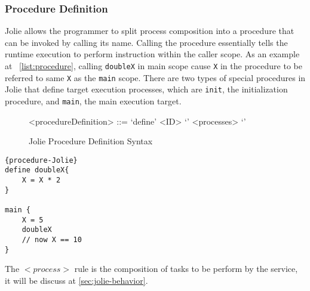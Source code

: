 \subsubsection{Procedure Definition}
\label{sec:jolie-procedure-def}

Jolie allows the programmer to split process composition into a procedure that can be invoked by calling its name. Calling the procedure essentially tells the runtime execution to perform instruction within the caller scope. As an example at ~\ref{list:procedure}, calling \texttt{doubleX} in main scope cause \texttt{X} in the procedure to be referred to same \texttt{X} as the \texttt{main} scope. There are two types of special procedures in Jolie that define target execution processes, which are \texttt{init}, the initialization procedure, and \texttt{main}, the main execution target.

\begin{figure}[h]
	\begin{framed}
		\begin{grammar}
			<procedureDefinition> ::= `define' <ID> `{' <processes> `}'
		\end{grammar}
	\end{framed}
	\caption{Jolie Procedure Definition Syntax}
\end{figure}


\begin{listing}[h]
\lstset{language=Jolie,
	style=codeStyle
}
\begin{lstlisting}[frame=tlrb, caption= {Jolie procedure example}, label={list:procedure}]{procedure-Jolie}
define doubleX{
	X = X * 2
}

main {
	X = 5
	doubleX
	// now X == 10
}
\end{lstlisting}
\end{listing}

The \(<process>\) rule is the composition of tasks to be perform by the service, it will be discuss at \autoref{sec:jolie-behavior}.

\FloatBarrier
